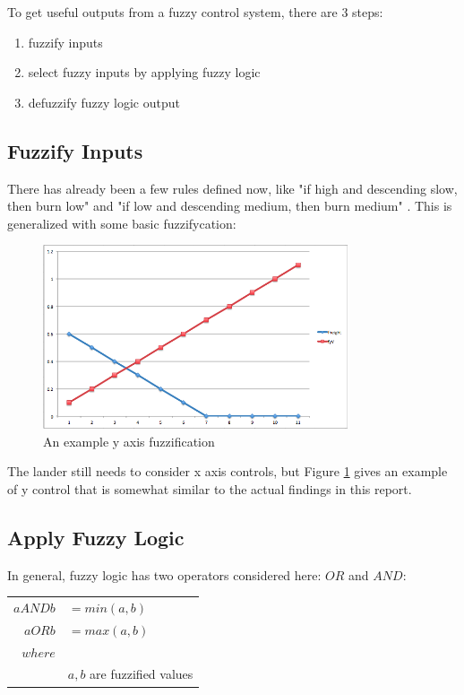 \documentclass[12pt]{article}
\begin{document}
To get useful outputs from a fuzzy control system, there are 3 steps:
\begin{enumerate}
	\item fuzzify inputs
	\item select fuzzy inputs by applying fuzzy logic
	\item defuzzify fuzzy logic output
\end{enumerate}

\subsection{Fuzzify Inputs}
There has already been a few rules defined now, like "if high and descending slow, then burn low" and 
"if low and descending medium, then burn medium" . This is generalized with some basic fuzzifycation:

\begin{figure}[h]
        \begin{center}
                \includegraphics[width=90mm]{report_images/ex_burn.png}
                \caption{An example y axis fuzzification}
                \label{ex_burn}
        \end{center}
\end{figure}

The lander still needs to consider x axis controls, but Figure \ref{ex_burn} gives an example of y control that
is somewhat similar to the actual findings in this report. 

\subsection{Apply Fuzzy Logic}
In general, fuzzy logic has two operators considered
here: $OR$ and $AND$:

\begin{tabular}{r l}
	$a AND b$		&	$ = min(a,b) $ \\
	$a OR b$		&	$ = max(a,b) $ \\
	$where$		&	\\
				&	$a,b$ are fuzzified values
\end{tabular}
\end{document}
